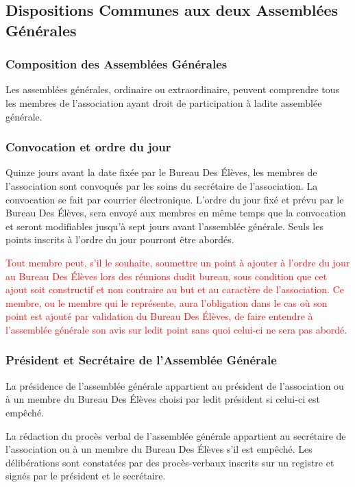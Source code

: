 \documentclass{article} %
\begin{document}
		\subsection{Dispositions Communes aux deux Assemblées Générales}
			\subsubsection{Composition des Assemblées Générales}
				Les assemblées générales, ordinaire ou extraordinaire, peuvent comprendre tous les membres de l’association ayant
				droit de participation à ladite assemblée générale.

			\subsubsection{Convocation et ordre du jour}
				Quinze jours avant la date fixée par le Bureau Des Élèves, les membres de l’association sont convoqués par les soins du
				secrétaire de l’association. La convocation se fait par courrier électronique.
				L’ordre du jour fixé et prévu par le Bureau Des Élèves, sera envoyé aux membres en même temps que la convocation et seront
				modifiables jusqu’à sept jours avant l'assemblée générale. Seuls les points inscrits à l’ordre du jour pourront être abordés.

				\textcolor{red}{Tout membre peut, s’il le souhaite, soumettre un point à ajouter à l’ordre du jour au Bureau Des Élèves lors des réunions
				dudit bureau, sous condition que cet ajout soit constructif et non contraire au but et au caractère de l’association.
				Ce membre, ou le membre qui le représente, aura l'obligation dans le cas où son point est ajouté par validation du Bureau Des Élèves,
				de faire entendre à l’assemblée générale son avis sur ledit point sans quoi celui-ci ne sera pas abordé.}

			\subsubsection{Président et Secrétaire de l’Assemblée Générale}
				La présidence de l’assemblée générale appartient au président de l’association ou à un membre du Bureau Des Élèves choisi
				par ledit président si celui-ci est empêché.

				La rédaction du procès verbal de l’assemblée générale appartient au secrétaire de l’association ou à un membre du Bureau Des Élèves
				s’il est empêché. Les délibérations sont constatées par des procès-verbaux inscrits sur un registre et signés par le président et le secrétaire.
\end{document}
